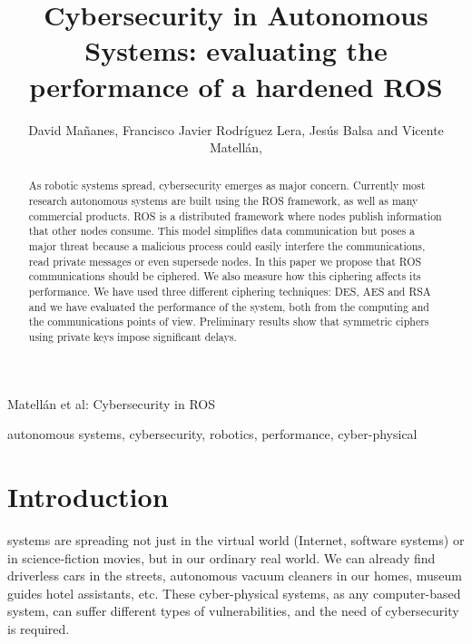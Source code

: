 \documentclass[journal,twoside]{JoPhA}
\begin{document}
\title{Cybersecurity in Autonomous Systems: evaluating the performance of a hardened ROS}

\author{David Ma\~nanes, Francisco Javier Rodr\'iguez Lera, Jes\'us Balsa and Vicente Matell\'an,
}


%
{Matell\'an et al: Cybersecurity in ROS}
\maketitle


\begin{abstract}
As robotic systems spread, cybersecurity emerges as major concern. Currently most research autonomous systems are built using the ROS framework, as well as many commercial products. ROS is a distributed framework where nodes publish information that other nodes consume. This model simplifies data communication but poses a major threat because a malicious process could easily interfere the communications, read private messages or even supersede nodes. In this paper we propose that ROS communications should be ciphered. We also measure how this ciphering affects its performance. We have used three different ciphering techniques: DES, AES and RSA and we have evaluated the performance of the system, both from the computing  and the communications points of view. Preliminary results show that symmetric ciphers using private keys impose significant delays.

\end{abstract}


\begin{IEEEkeywords}
autonomous systems, cybersecurity, robotics, performance, cyber-physical
\end{IEEEkeywords}


\section{Introduction}

 systems are spreading not just in the virtual world (Internet, software systems) or in science-fiction movies, but in our ordinary real world. We can already find driverless cars in the streets, autonomous vacuum cleaners in our homes, museum guides hotel assistants, etc. These cyber-physical systems, as any computer-based system, can suffer different types of vulnerabilities, and the  need of cybersecurity \cite{Morante2015} is required. 
\end{document}
